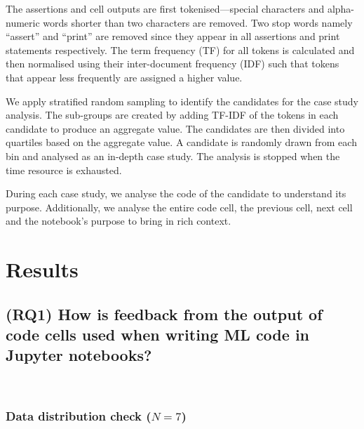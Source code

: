
The assertions and cell outputs are first tokenised---special characters and alpha-numeric words shorter than two characters are removed. Two stop words namely ``assert'' and ``print'' are removed since they appear in all assertions and print statements respectively. The term frequency (TF) for all tokens is calculated and then normalised using their inter-document frequency (IDF) such that tokens that appear less frequently are assigned a higher value.

We apply stratified random sampling to identify the candidates for the case study analysis. The sub-groups are created by adding TF-IDF of the tokens in each candidate to produce an aggregate value. The candidates are then divided into quartiles based on the aggregate value. A candidate is randomly drawn from each bin and analysed as an in-depth case study. The analysis is stopped when the time resource is exhausted.

During each case study, we analyse the code of the candidate to understand its purpose. Additionally, we analyse the entire code cell, the previous cell, next cell and the notebook's purpose to bring in rich context.

\section{Results}


\subsection{(RQ1) How is feedback from the output of code cells used when writing ML code in Jupyter notebooks?}~\label{sec:result-rq1}

\subsubsection{Data distribution check ($N = 7$)}~\label{sec:data-distribution-output}


